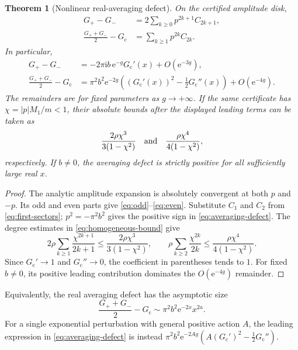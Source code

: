 \documentclass[11pt,a4paper]{article}
\numberwithin{equation}{section}
\newtheorem{theorem}{Theorem}[section]
\theoremstyle{definition}
\theoremstyle{remark}
\newcommand{\e}{\mathrm e}
\newcommand{\ii}{\mathrm i}
\newcommand{\cG}{G_{\mathrm c}}
\begin{document}
\begin{theorem}[Nonlinear real-averaging defect]
\label{thm:average}
On the certified amplitude disk,
\begin{align}
 G_+-G_-&=2\sum_{k\geq0}p^{2k+1}C_{2k+1},\label{eq:odd}\\
 \frac{G_++G_-}{2}-\cG&=\sum_{k\geq1}p^{2k}C_{2k}.\label{eq:even}
\end{align}
In particular,
\begin{align}
 G_+-G_-&=-2\pi\ii b\,\e^{-g}\cG'(x)+O(\e^{-3g}),\label{eq:oddleading}\\
 \frac{G_++G_-}{2}-\cG
 &=\pi^2b^2\e^{-2g}
 \left((\cG'(x))^2-\frac12\cG''(x)\right)+O(\e^{-4g}).
 \label{eq:averaging-defect}
\end{align}
The remainders are for fixed parameters as $g\to+\infty$. If the same certificate has $\chi=|p|M_1/m<1$, their absolute bounds after the displayed leading terms can be taken as
\begin{equation}
 \frac{2\rho\chi^3}{3(1-\chi^2)}
 \quad\hbox{and}\quad
 \frac{\rho\chi^4}{4(1-\chi^2)},
 \label{eq:parity-bounds}
\end{equation}
respectively. If $b\neq0$, the averaging defect is strictly positive for all sufficiently large real $x$.
\end{theorem}
\begin{proof}
The analytic amplitude expansion is absolutely convergent at both $p$ and $-p$. Its odd and even parts give \eqref{eq:odd}--\eqref{eq:even}. Substitute $C_1$ and $C_2$ from \eqref{eq:first-sectors}; $p^2=-\pi^2b^2$ gives the positive sign in \eqref{eq:averaging-defect}. The degree estimates in \eqref{eq:homogeneous-bound} give
\[
 2\rho\sum_{k\geq1}\frac{\chi^{2k+1}}{2k+1}
 \leq\frac{2\rho\chi^3}{3(1-\chi^2)},\qquad
 \rho\sum_{k\geq2}\frac{\chi^{2k}}{2k}
 \leq\frac{\rho\chi^4}{4(1-\chi^2)}.
\]
Since $\cG'\to1$ and $\cG''\to0$, the coefficient in parentheses tends to $1$. For fixed $b\neq0$, its positive leading contribution dominates the $O(\e^{-4g})$ remainder.
\end{proof}

Equivalently, the real averaging defect has the asymptotic size
\begin{equation}
 \frac{G_++G_-}{2}-\cG
 \sim\pi^2b^2\e^{-2x}x^{2a}.
 \label{eq:bias-x}
\end{equation}
For a single exponential perturbation with general positive action $A$, the leading expression in \eqref{eq:averaging-defect} is instead
$\pi^2b^2\e^{-2Ag}(A(\cG')^2-\frac12\cG'')$.
\end{document}
